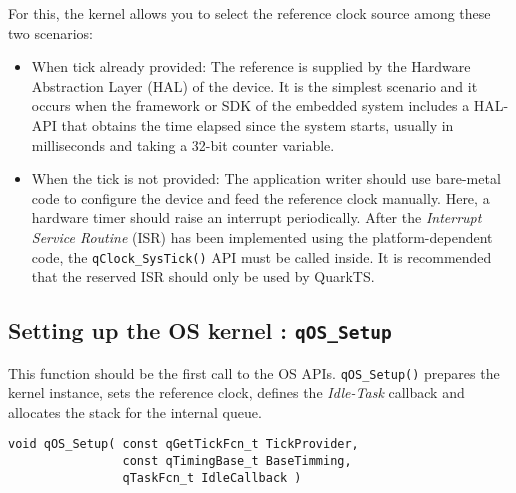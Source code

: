 For this, the kernel allows you to select the reference clock source among these two scenarios:

\begin{itemize}
    \item  When tick already provided: The reference is supplied by the Hardware Abstraction Layer (HAL) of the device.
        It is the simplest scenario and it occurs when the framework or SDK of the embedded system includes a HAL-API that obtains the time elapsed since the system starts, usually in milliseconds and taking a  32-bit counter variable.
    \item When the tick is not provided: The application writer should use bare-metal code to configure the device and feed the reference clock manually.
        Here, a hardware timer should raise an interrupt periodically. After the \textit{Interrupt Service Routine} (ISR) has been implemented using the platform-dependent code, the \lstinline{qClock_SysTick()}  API must be called inside. It is recommended that the reserved ISR should only be used by QuarkTS.
\end{itemize}

\subsection{Setting up the OS kernel : \lstinline{qOS_Setup}} \label{settingupkernel}
 This function should be the first call to the OS APIs. \lstinline{qOS_Setup()}  prepares the kernel instance, sets the reference clock, defines the \textit{Idle-Task} callback and allocates the stack for the internal queue. \\
 
\begin{lstlisting}[style=CStyle]
void qOS_Setup( const qGetTickFcn_t TickProvider, 
                const qTimingBase_t BaseTimming, 
                qTaskFcn_t IdleCallback )
\end{lstlisting}


